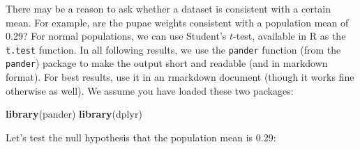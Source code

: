 \documentclass[]{book}
\newenvironment{Shaded}{\begin{snugshade}}{\end{snugshade}}
\newcommand{\DataTypeTok}[1]{\textcolor[rgb]{0.13,0.29,0.53}{#1}}
\newcommand{\FloatTok}[1]{\textcolor[rgb]{0.00,0.00,0.81}{#1}}
\newcommand{\KeywordTok}[1]{\textcolor[rgb]{0.13,0.29,0.53}{\textbf{#1}}}
\newcommand{\NormalTok}[1]{#1}
\newcommand{\OperatorTok}[1]{\textcolor[rgb]{0.81,0.36,0.00}{\textbf{#1}}}
\newcommand{\StringTok}[1]{\textcolor[rgb]{0.31,0.60,0.02}{#1}}
\begin{document}
There may be a reason to ask whether a dataset is consistent with a certain mean. For example, are the pupae weights consistent with a population mean of 0.29? For normal populations, we can use Student's \(t\)-test, available in R as the \texttt{t.test} function. In all following results, we use the \texttt{pander} function (from the \texttt{pander}) package to make the output short and readable (and in markdown format). For best results, use it in an rmarkdown document (though it works fine otherwise as well). We assume you have loaded these two packages:

\begin{Shaded}
\begin{Highlighting}[]
\KeywordTok{library}\NormalTok{(pander)}
\KeywordTok{library}\NormalTok{(dplyr)}
\end{Highlighting}
\end{Shaded}

Let's test the null hypothesis that the population mean is 0.29:

\begin{Shaded}
\end{Shaded}
\end{document}
